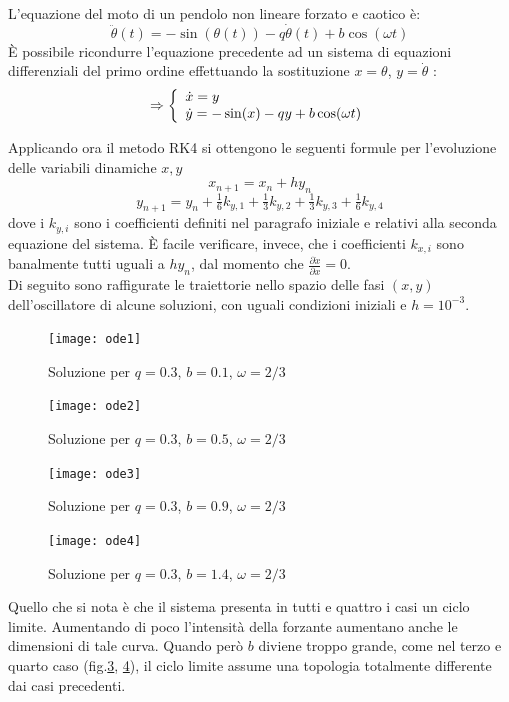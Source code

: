 L'equazione del moto di un pendolo non lineare forzato e caotico è:
$$\ddot{\theta}(t) = -\sin(\theta(t)) - q\dot{\theta}(t) + b\cos(\omega t)$$
È possibile ricondurre l'equazione precedente ad un sistema di equazioni differenziali del primo ordine effettuando la sostituzione $x=\theta$, $y=\dot{\theta}$ :
\[
  \Rightarrow \left\{
  \begin{array}{l l}
    \dot{x}=y\\
    \dot{y}=-\sin(x) - qy + b\cos(\omega t)\\
  \end{array} \right.
\]

Applicando ora il metodo RK4 si ottengono le seguenti formule per l'evoluzione delle variabili dinamiche $x,y$
$$x_{n+1}=x_n+hy_n$$
$$y_{n+1}=y_n+\tfrac16 k_{y,1}+\tfrac13 k_{y,2}+\tfrac13 k_{y,3}+\tfrac16k_{y,4}$$
dove i $k_{y,i}$ sono i coefficienti definiti nel paragrafo iniziale e relativi alla seconda equazione del sistema. È facile verificare, invece, che i coefficienti $k_{x,i}$ sono banalmente tutti uguali a $hy_n$, dal momento che $\frac{\partial\dot{x}}{\partial x}=0$.
\\

Di seguito sono raffigurate le traiettorie nello spazio delle fasi $(x,y)$ dell'oscillatore di alcune soluzioni, con uguali condizioni iniziali e $h=10^{-3}$.
\begin{figure}[H]
\centering
\texttt{[image: ode1]}
\caption{Soluzione per $q=0.3$, $b=0.1$, $\omega=2/3$}
\label{fig:ode1}
\end{figure}

\begin{figure}[H]
\centering
\texttt{[image: ode2]}
\caption{Soluzione per $q=0.3$, $b=0.5$, $\omega=2/3$}
\label{fig:ode2}
\end{figure}

\begin{figure}[H]
\centering
\texttt{[image: ode3]}
\caption{Soluzione per $q=0.3$, $b=0.9$, $\omega=2/3$}
\label{fig:ode3}
\end{figure}

\begin{figure}[H]
\centering
\texttt{[image: ode4]}
\caption{Soluzione per $q=0.3$, $b=1.4$, $\omega=2/3$}
\label{fig:ode4}
\end{figure}

Quello che si nota è che il sistema presenta in tutti e quattro i casi un ciclo limite. Aumentando di poco l'intensità della forzante aumentano anche le dimensioni di tale curva. Quando però $b$ diviene troppo grande, come nel terzo e quarto caso (fig.\ref{fig:ode3}, \ref{fig:ode4}), il ciclo limite assume una topologia totalmente differente dai casi precedenti.
